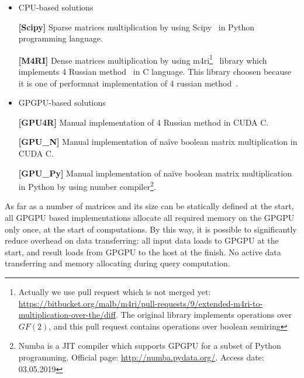 \begin{itemize}
  \item CPU-based solutions

    \textbf{[Scipy]} Sparse matrices multiplication by using Scipy~\cite{scipy} in Python programming language.

    \textbf{[M4RI]} Dense matrices multiplication by using m4ri\footnote{Actually we use pull request which is not merged yet: \url{https://bitbucket.org/malb/m4ri/pull-requests/9/extended-m4ri-to-multiplication-over-the/diff}. The original library implements operations over $GF(2)$, and this pull request contains operations over boolean semiring}~\cite{M4RI} library which implements 4 Russian method~\cite{arlazarov1970economical} in C language.
    This library choosen because it is one of performnat implementation of 4 russian method~\cite{albrechtefficient}.
  \item GPGPU-based solutions

    \textbf{[GPU4R]} Manual implementation of 4 Russian method in CUDA C.

    \textbf{[GPU\_N]} Manual implementation of na\"ive boolean matrix multiplication in CUDA C.

    \textbf{[GPU\_Py]} Manual implementation of na\"ive boolean matrix multiplication in Python by using number compiler\footnote{Numba is a JIT compiler which supports GPGPU for a subset of Python programming. Official page: \url{http://numba.pydata.org/}. Access date: 03.05.2019}.

\end{itemize}

As far as a number of matrices and its size can be statically defined at the start, all GPGPU based implementations allocate all required memory on the GPGPU only once, at the start of computations.
By this way, it is possible to significantly reduce overhead on data transferring: all input data loads to GPGPU at the start, and result loads from GPGPU to the host at the finish.
No active data transferring and memory allocating during query computation.
